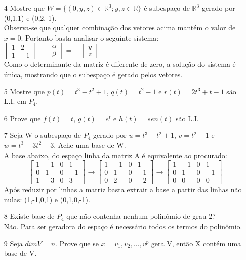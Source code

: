 \documentclass[a4paper]{article}
\begin{document}
\begin{itemize}
\item[4] Mostre que $W=\{(0,y,z)\in \mathbb{R}^3;y,z \in \mathbb{R}\}$ é subespaço  de $\mathbb{R}^3$ gerado por (0,1,1) e (0,2,-1).
\\ \textcolor[rgb]{0,0,1}{
Observa-se que qualquer combinação dos vetores acima mantém o valor de $x=0$. Portanto basta analisar o seguinte sistema:
\\
$
\left[\begin{array}{rr}
1&2\\
1&-1
\end{array}\right]
\quad
\left[\begin{array}{c}
\alpha\\
\beta
\end{array}\right]
=
\quad
\left[\begin{array}{c}
y\\
z
\end{array}\right]
$
\\ Como o determinante da matriz é diferente de zero, a solução do sistema é única, mostrando que o subespaço é gerado pelos vetores.
}

\item[5] Mostre que $p(t)=t^3-t^2+1$, $q(t)=t^2-1$ e $r(t)=2t^3+t-1$ são L.I. em $P_4$.
\item[6] Prove que $f(t)=t$, $g(t)=e^t$ e $h(t)=sen(t)$ são L.I.
\item[7] Seja W o subespaço de $P_4$ gerado por $u=t^3-t^2+1$, $v=t^2-1$ e $w=t^3-3t^2+3$. Ache uma base de W.
\\\textcolor[rgb]{0,0,1}{A base abaixo, do espaço linha da matriz A é equivalente ao procurado:
$$
\left[\begin{array}{rrrr}
1&-1&0&1\\
0&1&0&-1\\
1&-3&0&3
\end{array}\right]
\rightarrow
\left[\begin{array}{rrrr}
1&-1&0&1\\
0&1&0&-1\\
0&2&0&-2
\end{array}\right]
\rightarrow
\left[\begin{array}{rrrr}
1&-1&0&1\\
0&1&0&-1\\
0&0&0&0
\end{array}\right]
$$
Após reduzir por linhas a matriz basta extrair a base a partir das linhas não nulas:
(1,-1,0,1) e (0,1,0,-1).}

\item[8] Existe base de $P_4$ que não contenha nenhum polinômio de grau 2?
\textcolor[rgb]{0,0,1}{\\Não. Para ser geradora do espaço é necessário todos os termos do polinômio.}
\item[9] Seja $dimV=n$. Prove que se $x={v_1,v_2,...,v^p}$ gera V, então X contém uma base de V.


\end{itemize}
\end{document}
